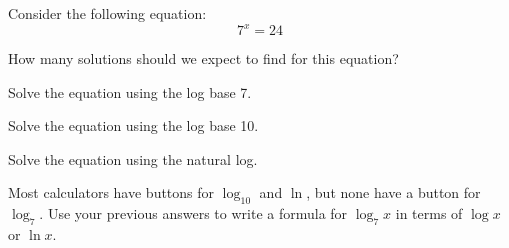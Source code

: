 \begin{activity}\label{A:0.4.3}
    Consider the following equation:
	\[
		7^{x} = 24
	\]

	\ba
		\item How many solutions should we expect to find for this equation?
		\item Solve the equation using the log base 7.
		\item Solve the equation using the log base 10.
		\item Solve the equation using the natural log.
		\item Most calculators have buttons for $\log_{10}$ and $\ln$, but none have a button for $\log_{7}$. Use your previous answers to write a formula for $\log_{7}x$ in terms of 					$\log x$ or $\ln x$.
	\ea

\end{activity}\aftera
